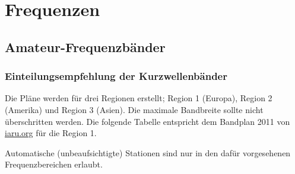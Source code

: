 
\chapter{Frequenzen}
\section{Amateur-Frequenzbänder}
\subsection{Einteilungsempfehlung der Kurzwellenbänder}
Die Pläne werden für drei Regionen erstellt; Region 1 (Europa), Region 2 (Amerika) und Region 3 (Asien). Die maximale Bandbreite sollte nicht überschritten werden. Die folgende Tabelle entspricht dem Bandplan 2011 von \href{http://www.iaru.org/region-1.html}{iaru.org} für die Region 1.

Automatische (unbeaufsichtigte) Stationen sind nur in den dafür vorgesehenen Frequenzbereichen erlaubt.

